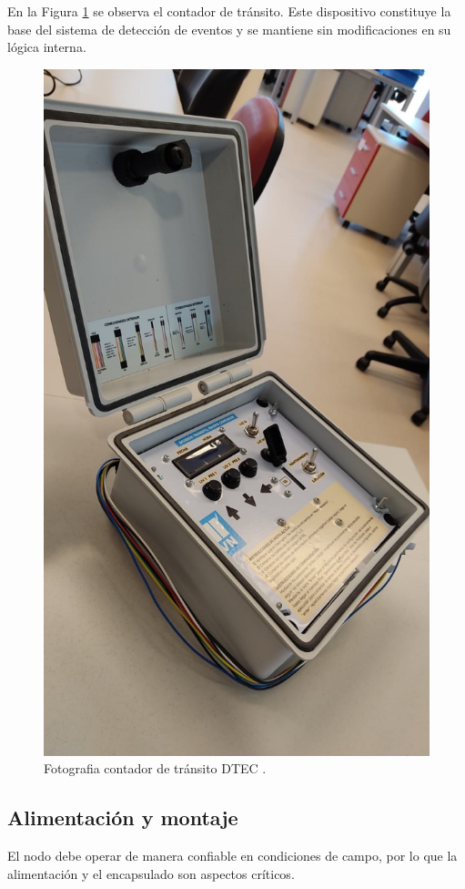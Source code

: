 En la Figura \ref{fig:foto_dtec} se observa el contador de tránsito. Este dispositivo constituye la base del sistema de detección de eventos y se mantiene sin modificaciones en su lógica interna. 



\begin{figure}[htbp]
  \centering
  \includegraphics[width=0.5\linewidth]{./Figures/fotoDTEC.jpeg}
  \caption{Fotografia contador de tránsito DTEC \protect\footnotemark.}
  \label{fig:foto_dtec}
\end{figure}


\subsection{Alimentación y montaje}

El nodo debe operar de manera confiable en condiciones de campo, por lo que la alimentación y el encapsulado son aspectos críticos.

